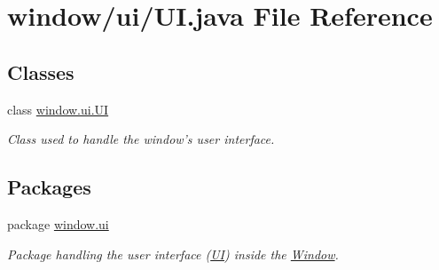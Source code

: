 \hypertarget{a00056}{\section{window/ui/\-U\-I.java File Reference}
\label{a00056}
}
\subsection*{Classes}
\begin{DoxyCompactItemize}
\item 
class \hyperlink{a00034}{window.\-ui.\-U\-I}
\begin{DoxyCompactList}\small\item\em Class used to handle the window's user interface. \end{DoxyCompactList}\end{DoxyCompactItemize}
\subsection*{Packages}
\begin{DoxyCompactItemize}
\item 
package \hyperlink{a00088}{window.\-ui}
\begin{DoxyCompactList}\small\item\em Package handling the user interface (\hyperlink{a00034}{U\-I}) inside the \hyperlink{a00037}{Window}. \end{DoxyCompactList}\end{DoxyCompactItemize}
